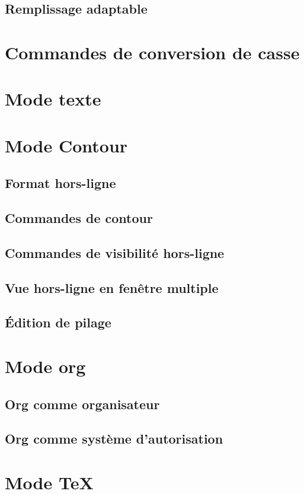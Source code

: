 \subsection{Remplissage adaptable}
\section{Commandes de conversion de casse}
\section{Mode texte}
\section{Mode Contour}
\subsection{Format hors-ligne}
\subsection{Commandes de contour}
\subsection{Commandes de visibilité hors-ligne}
\subsection{Vue hors-ligne en fenêtre multiple}
\subsection{\'Edition de pilage}
\section{Mode org}
\subsection{Org comme organisateur}
\subsection{Org comme système d'autorisation}

\section{Mode \TeX{}}

